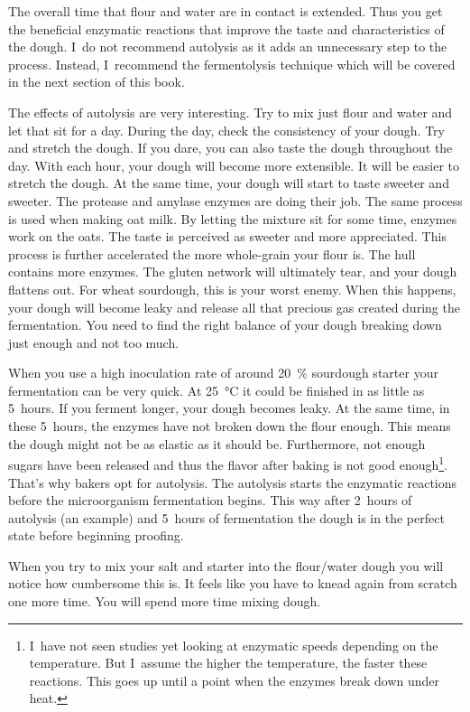 The overall time that flour and water are in contact is extended. Thus you get the
beneficial enzymatic reactions that improve the taste and characteristics of the
dough. I~do not recommend autolysis as it adds an unnecessary step to the
process. Instead, I~recommend the fermentolysis technique which will be covered in the
next section of this book.

The effects of autolysis are very interesting. Try to mix just flour and
water and let that sit for a day. During the day, check the consistency of
your dough. Try and stretch the dough. If you dare, you can also taste the
dough throughout the day. With each hour, your dough will become
more extensible. It will be easier to stretch the dough. At the same time, your
dough will start to taste sweeter and sweeter. The protease and amylase enzymes
are doing their job. The same process is used when making oat milk. By letting
the mixture sit for some time, enzymes work on the oats. The taste is perceived as
sweeter and more appreciated. This process is further accelerated the more
whole-grain your flour is. The hull contains more enzymes. The gluten network
will ultimately tear, and your dough flattens out. For wheat sourdough, this is
your worst enemy. When this happens, your dough will become leaky and release
all that precious gas created during the fermentation. You need to find the
right balance of your dough breaking down just enough and not too much.

When you use a high inoculation rate of around \qty{20}{\percent} sourdough starter
your fermentation can be very quick. At \qty{25}{\degreeCelsius} it could be finished in as little as 5~hours.
If you ferment longer, your dough becomes leaky. At the same time, in
these 5~hours, the enzymes have not broken down the flour enough. This means
the dough might not be as elastic as it should be. Furthermore, not enough
sugars have been released and thus the flavor after baking is not good
enough\footnote{I~have not seen studies yet looking at enzymatic speeds depending on
the temperature. But I~assume the higher the temperature, the faster these
reactions. This goes up until a point when the enzymes break down under
heat.}. That's why bakers opt for autolysis. The autolysis starts the enzymatic
reactions before the microorganism fermentation begins. This way after 2~hours
of autolysis (an example) and 5~hours of fermentation the dough is in the
perfect state before beginning proofing.

When you try to mix your salt and starter into the flour/water dough you will
notice how cumbersome this is. It feels like you have to knead again from scratch
one more time. You will spend more time mixing dough.

